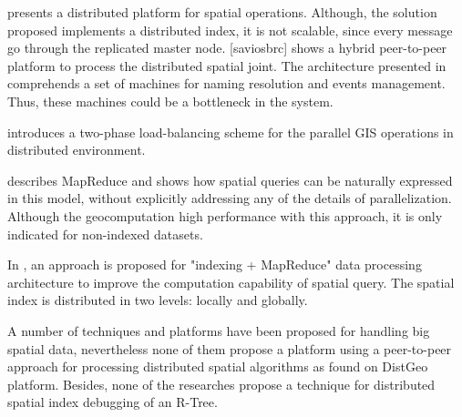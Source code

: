 \cite{dedsi} presents a distributed platform for spatial operations. Although, the solution proposed implements a distributed index, it is not scalable, since every message go through the replicated master node. 
[saviosbrc] shows a hybrid peer-to-peer platform to process the distributed spatial joint. The architecture presented in \cite{de2013processamento} comprehends a set of machines for naming resolution and events management. 
Thus, these machines could be a bottleneck in the system.    

\cite{xie2008two} introduces a two-phase load-balancing scheme for the parallel GIS operations in distributed environment.

\cite{zhang2009spatial} describes MapReduce and shows how spatial queries can be naturally expressed in this model, without explicitly addressing any of the details of parallelization. 
Although the geocomputation high performance with this approach, it is only indicated for non-indexed datasets.

In \cite{zhong2012towards}, an approach is proposed for "indexing + MapReduce" data processing architecture to improve the computation capability of spatial query. 
The spatial index is distributed in two levels: locally and globally.

A number of techniques and platforms have been proposed for handling big spatial data, 
nevertheless none of them propose a platform using a peer-to-peer approach for processing distributed spatial algorithms as found on DistGeo platform. 
Besides, none of the researches propose a technique for distributed spatial index debugging of an R-Tree.